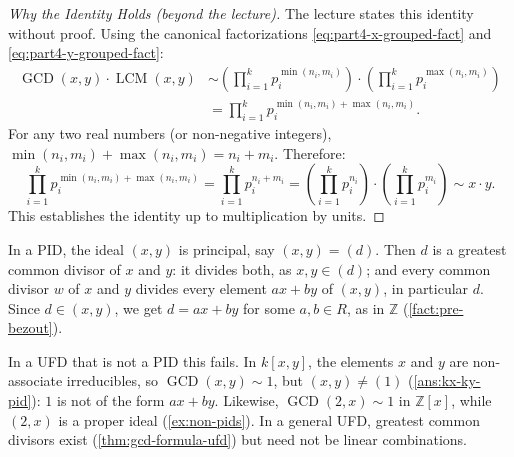 \begin{content}

\begin{proof}[Why the Identity Holds (beyond the lecture)]
The lecture states this identity without proof. Using the canonical factorizations \eqref{eq:part4-x-grouped-fact} and \eqref{eq:part4-y-grouped-fact}:
\begin{align*}
\operatorname{GCD}(x, y) \cdot \operatorname{LCM}(x, y) &\sim \left( \prod_{i=1}^k p_i^{\min(n_i, m_i)} \right) \cdot \left( \prod_{i=1}^k p_i^{\max(n_i, m_i)} \right) \\
&= \prod_{i=1}^k p_i^{\min(n_i, m_i) + \max(n_i, m_i)}.
\end{align*}
For any two real numbers (or non-negative integers), $\min(n_i, m_i) + \max(n_i, m_i) = n_i + m_i$. Therefore:
\[
\prod_{i=1}^k p_i^{\min(n_i, m_i) + \max(n_i, m_i)} = \prod_{i=1}^k p_i^{n_i + m_i} = \left( \prod_{i=1}^k p_i^{n_i} \right) \cdot \left( \prod_{i=1}^k p_i^{m_i} \right) \sim x \cdot y.
\]
This establishes the identity up to multiplication by units.
\end{proof}
\end{content}

\begin{aiNote}
In a PID, the ideal $(x, y)$ is principal, say $(x, y) = (d)$. Then $d$ is a greatest common divisor of $x$ and $y$: it divides both, as $x, y \in (d)$; and every common divisor $w$ of $x$ and $y$ divides every element $a x + b y$ of $(x, y)$, in particular $d$. Since $d \in (x, y)$, we get  $d = a x + b y$ for some $a, b \in R$, as in $\mathbb{Z}$ (\cref{fact:pre-bezout}).

In a UFD that is not a PID this fails. In $k[x, y]$, the elements $x$ and $y$ are non-associate irreducibles, so $\operatorname{GCD}(x, y) \sim 1$, but $(x, y) \neq (1)$ (\cref{ans:kx-ky-pid}): $1$ is not of the form $a x + b y$. Likewise, $\operatorname{GCD}(2, x) \sim 1$ in $\mathbb{Z}[x]$, while $(2, x)$ is a proper ideal (\cref{ex:non-pids}). In a general UFD, greatest common divisors exist (\cref{thm:gcd-formula-ufd}) but need not be linear combinations.
\end{aiNote}

